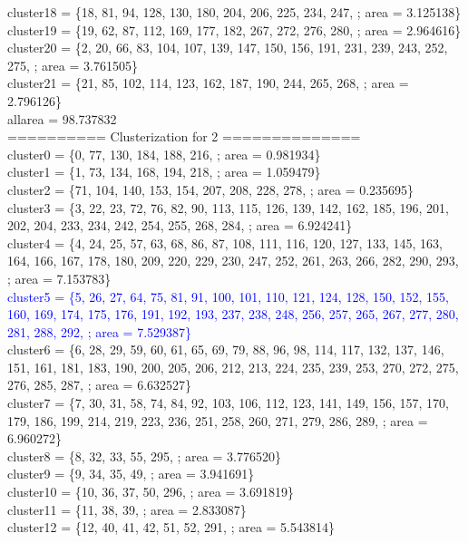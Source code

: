 \documentclass[a4paper,12pt, titlepage]{article}
\begin{document}
cluster18 = \{18, 81, 94, 128, 130, 180, 204, 206, 225, 234, 247, ; area = 3.125138\}\\
cluster19 = \{19, 62, 87, 112, 169, 177, 182, 267, 272, 276, 280, ; area = 2.964616\}\\
cluster20 = \{2, 20, 66, 83, 104, 107, 139, 147, 150, 156, 191, 231, 239, 243, 252, 275, ; area = 3.761505\}\\
cluster21 = \{21, 85, 102, 114, 123, 162, 187, 190, 244, 265, 268, ; area = 2.796126\}\\
allarea = 98.737832\\
==========  Clusterization for 2 ==============\\
cluster0 = \{0, 77, 130, 184, 188, 216, ; area = 0.981934\}\\
cluster1 = \{1, 73, 134, 168, 194, 218, ; area = 1.059479\}\\
cluster2 = \{71, 104, 140, 153, 154, 207, 208, 228, 278, ; area = 0.235695\}\\
cluster3 = \{3, 22, 23, 72, 76, 82, 90, 113, 115, 126, 139, 142, 162, 185, 196, 201, 202, 204, 233, 234, 242, 254, 255, 268, 284, ; area = 6.924241\}\\
cluster4 = \{4, 24, 25, 57, 63, 68, 86, 87, 108, 111, 116, 120, 127, 133, 145, 163, 164, 166, 167, 178, 180, 209, 220, 229, 230, 247, 252, 261, 263, 266, 282, 290, 293, ; area = 7.153783\}\\
\textcolor{blue}
{
cluster5 = \{5, 26, 27, 64, 75, 81, 91, 100, 101, 110, 121, 124, 128, 150, 152, 155, 160, 169, 174, 175, 176, 191, 192, 193, 237, 238, 248, 256, 257, 265, 267, 277, 280, 281, 288, 292, ; area = 7.529387\}\\
}
cluster6 = \{6, 28, 29, 59, 60, 61, 65, 69, 79, 88, 96, 98, 114, 117, 132, 137, 146, 151, 161, 181, 183, 190, 200, 205, 206, 212, 213, 224, 235, 239, 253, 270, 272, 275, 276, 285, 287, ; area = 6.632527\}\\
cluster7 = \{7, 30, 31, 58, 74, 84, 92, 103, 106, 112, 123, 141, 149, 156, 157, 170, 179, 186, 199, 214, 219, 223, 236, 251, 258, 260, 271, 279, 286, 289, ; area = 6.960272\}\\
cluster8 = \{8, 32, 33, 55, 295, ; area = 3.776520\}\\
cluster9 = \{9, 34, 35, 49, ; area = 3.941691\}\\
cluster10 = \{10, 36, 37, 50, 296, ; area = 3.691819\}\\
cluster11 = \{11, 38, 39, ; area = 2.833087\}\\
cluster12 = \{12, 40, 41, 42, 51, 52, 291, ; area = 5.543814\}\\
\end{document}

